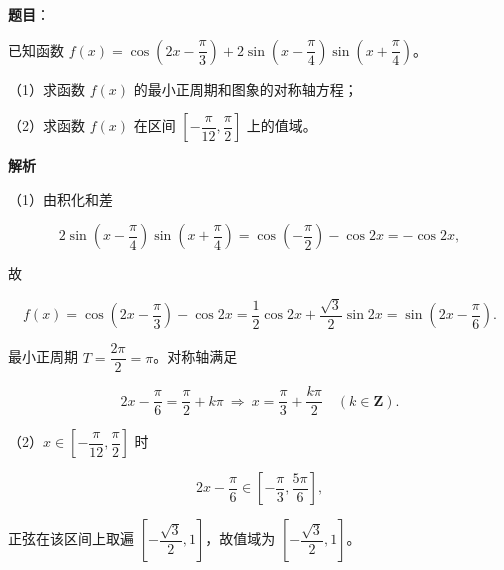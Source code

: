 \begin{answer}

\textbf{题目}：

已知函数 $f(x)=\cos\left(2x-\dfrac{\pi}{3}\right)+2\sin\left(x-\dfrac{\pi}{4}\right)\sin\left(x+\dfrac{\pi}{4}\right)$。

（1）求函数 $f(x)$ 的最小正周期和图象的对称轴方程；

（2）求函数 $f(x)$ 在区间 $\left[-\dfrac{\pi}{12},\dfrac{\pi}{2}\right]$ 上的值域。

\textbf{解析}

（1）由积化和差

\nopagebreak[4]
\[2\sin\left(x-\frac{\pi}4\right)\sin\left(x+\frac{\pi}4\right)=\cos\left(-\frac{\pi}2\right)-\cos2x=-\cos2x,\]

故

\nopagebreak[4]
\[f(x)=\cos\left(2x-\frac{\pi}3\right)-\cos2x=\frac12\cos2x+\frac{\sqrt3}2\sin2x=\sin\left(2x-\frac{\pi}6\right).\]

最小正周期 $T=\dfrac{2\pi}2=\pi$。对称轴满足

\nopagebreak[4]
\[2x-\frac{\pi}6=\frac{\pi}2+k\pi\ \Longrightarrow\ x=\frac{\pi}3+\frac{k\pi}2\quad(k\in\mathbf Z).\]

（2）$x\in\left[-\dfrac{\pi}{12},\dfrac{\pi}{2}\right]$ 时

\nopagebreak[4]
\[2x-\frac{\pi}{6}\in\left[-\frac{\pi}3,\frac{5\pi}6\right],\]

正弦在该区间上取遍 $\left[-\dfrac{\sqrt3}2,1\right]$，故值域为 $\left[-\dfrac{\sqrt3}2,1\right]$。


\end{answer}
